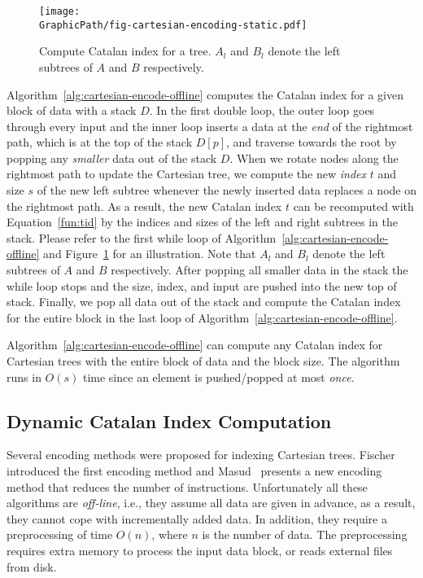 

\begin{figure}[!thb]
  \centering
  \texttt{[image: \\GraphicPath/fig-cartesian-encoding-static.pdf]}
  \caption{Compute Catalan index for a tree.  $A_l$ and $B_l$ denote
    the left subtrees of $A$ and $B$ respectively.}
  \label{fig:fig-cartesian-encoding-static}
\end{figure}

Algorithm~\ref{alg:cartesian-encode-offline} computes the Catalan index
for a given block of data with a stack $D$.  In the first double loop,
the outer loop goes through every input and the inner loop inserts a
data at the {\em end} of the rightmost path, which is at the top of the
stack $D[p]$, and traverse towards the root by popping any {\em smaller}
data out of the stack $D$.  When we rotate nodes along the rightmost
path to update the Cartesian tree, we compute the new {\em index} $t$
and size $s$ of the new left subtree whenever the newly inserted data
replaces a node on the rightmost path.  As a result, the new Catalan
index $t$ can be recomputed with Equation~\ref{fun:tid} by the indices
and sizes of the left and right subtrees in the stack.  Please refer to
the first while loop of Algorithm~\ref{alg:cartesian-encode-offline} and
Figure~\ref{fig:fig-cartesian-encoding-static} for an illustration. Note
that $A_l$ and $B_l$ denote the left subtrees of $A$ and $B$
respectively.  After popping all smaller data in the stack the while
loop stops and the size, index, and input are pushed into the new top of
stack.  Finally, we pop all data out of the stack and compute the
Catalan index for the entire block in the last loop of
Algorithm~\ref{alg:cartesian-encode-offline}.

Algorithm~\ref{alg:cartesian-encode-offline} can compute any Catalan
index for Cartesian trees with the entire block of data and the block
size.  The algorithm runs in $O(s)$ time since an element is
pushed/popped at most {\em once}.

\subsection{Dynamic Catalan Index Computation} \label{sec:dynamic}

Several encoding methods were proposed for indexing Cartesian trees.
Fischer~\cite{Fischer2006TheoreticalAP} introduced the first encoding
method and Masud~\cite{Hasan2010CacheOA} presents a new encoding method
that reduces the number of instructions. Unfortunately all these
algorithms are {\em off-line}, i.e., they assume all data are given in
advance, as a result, they cannot cope with incrementally added data.
In addition, they require a preprocessing of time $O(n)$, where $n$ is
the number of data.  The preprocessing requires extra memory to process
the input data block, or reads external files from disk.

